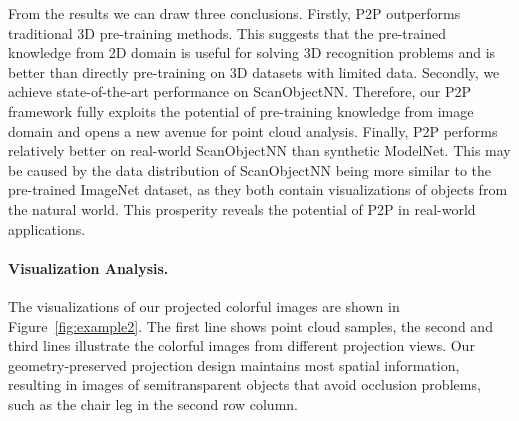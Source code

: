 \documentclass{article}
\begin{document}
From the results we can draw three conclusions. Firstly, P2P outperforms traditional 3D pre-training methods. This suggests that the pre-trained knowledge from 2D domain is useful for solving 3D recognition problems and is better than directly pre-training on 3D datasets with limited data. Secondly, we achieve state-of-the-art performance on ScanObjectNN. Therefore, our P2P framework fully exploits the potential of pre-training knowledge from image domain and opens a new avenue for point cloud analysis. Finally, P2P performs relatively better on real-world ScanObjectNN than synthetic ModelNet. This may be caused by the data distribution of ScanObjectNN being more similar to the pre-trained ImageNet dataset, as they both contain visualizations of objects from the natural world. This prosperity reveals the potential of P2P in real-world applications.

\paragraph{Visualization Analysis.}

The visualizations of our projected colorful images are shown in Figure~\ref{fig:example2}. The first line shows point cloud samples, the second and third lines illustrate the colorful images from different projection views. Our geometry-preserved projection design maintains most spatial information, resulting in images of semitransparent objects that avoid occlusion problems, such as the chair leg in the second row  column. 
\end{document}
